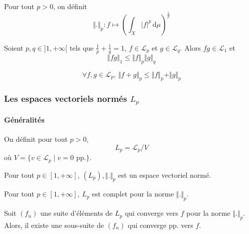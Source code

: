 	\begin{definition}
		Pour tout $p > 0$, on définit
		\[ \Vert . \Vert_p : f \mapsto \left( \int_X \vert f \vert^p \, \mathrm{d}\mu \right)^{\frac{1}{p}} \]
	\end{definition}

	\begin{theorem}
		Soient $p, q \in ]1, +\infty[$ tels que $\frac{1}{p} + \frac{1}{q} = 1$, $f \in \mathcal{L}_p$ et $g \in \mathcal{L}_q$. Alors $fg \in \mathcal{L}_1$ et
		\[ \Vert fg \Vert_1 \leq \Vert f \Vert_p \Vert g \Vert_q \]
	\end{theorem}

	\begin{theorem}
		\[ \forall f, g \in \mathcal{L}_p, \, \Vert f + g \Vert_p \leq \Vert f \Vert_p + \Vert g \Vert_p \]
	\end{theorem}

	\subsubsection{Les espaces vectoriels normés \texorpdfstring{$L_p$}{Lₚ}}

	\paragraph{Généralités}


	\begin{definition}
		On définit pour tout $p > 0$,
		\[ L_p = \mathcal{L}_p / V \]
		où $V = \{ v \in \mathcal{L}_p \mid v = 0 \text{ pp.} \}$.
	\end{definition}

	\begin{theorem}
		Pour tout $p \in [1, +\infty]$, $(L_p), \Vert . \Vert_p$ est un espace vectoriel normé.
	\end{theorem}

	\begin{theorem}
		Pour tout $p \in [1, +\infty]$, $L_p$ est complet pour la norme $\Vert . \Vert_p$.
	\end{theorem}

	\begin{theorem}
		Soit $(f_n)$ une suite d'éléments de $L_p$ qui converge vers $f$ pour la norme $\Vert . \Vert_p$. Alors, il existe une sous-suite de $(f_n)$ qui converge pp. vers $f$.
	\end{theorem}

